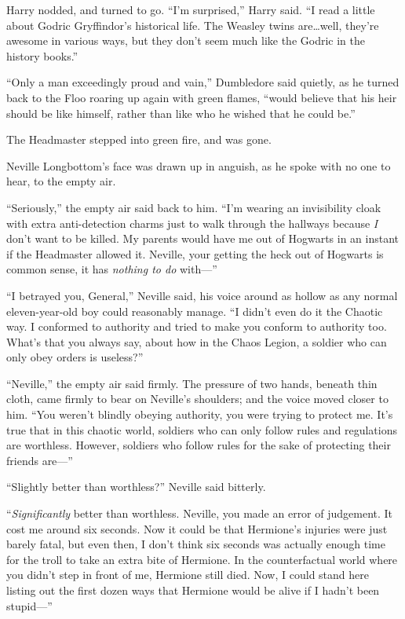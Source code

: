 Harry nodded, and turned to go. “I’m surprised,” Harry said. “I read a little about Godric Gryffindor’s historical life. The Weasley twins are…well, they’re awesome in various ways, but they don’t seem much like the Godric in the history books.”

“Only a man exceedingly proud and vain,” Dumbledore said quietly, as he turned back to the Floo roaring up again with green flames, “would believe that his heir should be like himself, rather than like who he wished that he could be.”

The Headmaster stepped into green fire, and was gone.


Neville Longbottom’s face was drawn up in anguish, as he spoke with no one to hear, to the empty air.

“Seriously,” the empty air said back to him. “I’m wearing an invisibility cloak with extra anti-detection charms just to walk through the hallways because \emph{I} don’t want to be killed. My parents would have me out of Hogwarts in an instant if the Headmaster allowed it. Neville, your getting the heck out of Hogwarts is common sense, it has \emph{nothing to do} with—”

“I betrayed you, General,” Neville said, his voice around as hollow as any normal eleven-year-old boy could reasonably manage. “I didn’t even do it the Chaotic way. I conformed to authority and tried to make you conform to authority too. What’s that you always say, about how in the Chaos Legion, a soldier who can only obey orders is useless?”

“Neville,” the empty air said firmly. The pressure of two hands, beneath thin cloth, came firmly to bear on Neville’s shoulders; and the voice moved closer to him. “You weren’t blindly obeying authority, you were trying to protect me. It’s true that in this chaotic world, soldiers who can only follow rules and regulations are worthless. However, soldiers who follow rules for the sake of protecting their friends are—”

“Slightly better than worthless?” Neville said bitterly.

“\emph{Significantly} better than worthless. Neville, you made an error of judgement. It cost me around six seconds. Now it could be that Hermione’s injuries were just barely fatal, but even then, I don’t think six seconds was actually enough time for the troll to take an extra bite of Hermione. In the counterfactual world where you didn’t step in front of me, Hermione still died. Now, I could stand here listing out the first dozen ways that Hermione would be alive if I hadn’t been stupid—”


